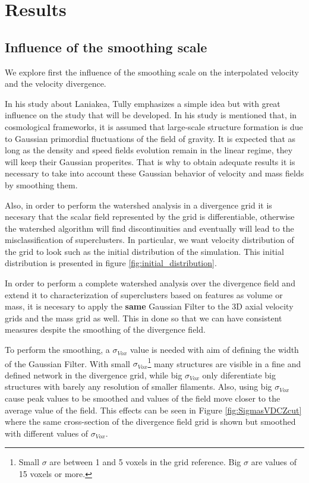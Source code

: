 \documentclass[usenatbib]{mnras}
\begin{document}
\section{Results}

\subsection{Influence of the smoothing scale}

We explore first the influence of the smoothing scale on the
interpolated velocity and the velocity divergence.

In his study about Laniakea, Tully\cite{tully_laniakea_2014}
emphasizes a simple idea but with great influence on the study that
will be developed. In his study is mentioned that, in cosmological
frameworks, it is assumed that large-scale structure formation is due
to Gaussian primordial fluctuations of the field of gravity. It is
expected that as long as the density and speed fields evolution remain
in the linear regime, they will keep their Gaussian properites. That
is why to obtain adequate results it is necessary to take into account
these Gaussian behavior of velocity and mass fields by smoothing
them. 

Also, in order to perform the watershed analysis in a divergence grid
it is necesary that the scalar field represented by the grid is
differentiable, otherwise the watershed algorithm will find
discontinuities and eventually will lead to the misclassification of
superclusters. In particular, we want velocity distribution of the
grid to look such as the initial distribution of the simulation. This
initial distribution is presented in figure
\ref{fig:initial_distribution}. 

In order to perform a complete watershed analysis over the divergence
field and extend it to characterization of superclusters based on
features as volume or mass,  it is necesary to apply the
\textbf{same} Gaussian Filter to the 3D axial velocity grids and the
mass grid as well. This in done so that we can have consistent
measures despite the smoothing of the divergence field. 




To perform the smoothing, a $\sigma_{Vox}$ value is needed with aim of defining the width of the Gaussian Filter. With small $\sigma_{Vox}$\footnote{Small $\sigma$ are between 1 and 5 voxels in the grid reference. Big $\sigma$ are values of 15 voxels or more.} many structures are visible in a fine and defined network in the divergence grid, while big $\sigma_{Vox}$ only diferentiate big structures with barely any resolution of smaller filaments. Also, using big $\sigma_{Vox}$ cause peak values to be smoothed and values of the field move closer to  the average value of the field. This effects can be seen in Figure \ref{fig:SigmasVDCZcut} where the same cross-section of the divergence field grid is shown but smoothed with different values of $\sigma_{Vox}$.
\end{document}
